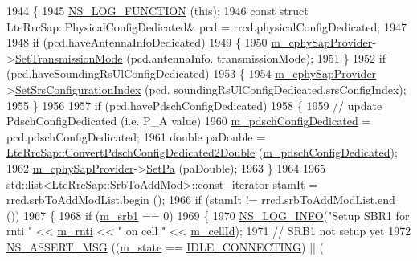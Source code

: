 \begin{DoxyCode}
1944 \{
1945   \hyperlink{log-macros-disabled_8h_a90b90d5bad1f39cb1b64923ea94c0761}{NS\_LOG\_FUNCTION} (\textcolor{keyword}{this});
1946   \textcolor{keyword}{const} \textcolor{keyword}{struct }LteRrcSap::PhysicalConfigDedicated& pcd = rrcd.physicalConfigDedicated;
1947 
1948   \textcolor{keywordflow}{if} (pcd.haveAntennaInfoDedicated)
1949     \{
1950       \hyperlink{classns3_1_1LteUeRrc_a0441858e31f56c75678afa92b7c7193d}{m\_cphySapProvider}->\hyperlink{classns3_1_1LteUeCphySapProvider_a92a30f0799cd2eb146b587e6e07263d0}{SetTransmissionMode} (pcd.antennaInfo.
      transmissionMode);
1951     \}
1952   \textcolor{keywordflow}{if} (pcd.haveSoundingRsUlConfigDedicated)
1953     \{
1954       \hyperlink{classns3_1_1LteUeRrc_a0441858e31f56c75678afa92b7c7193d}{m\_cphySapProvider}->\hyperlink{classns3_1_1LteUeCphySapProvider_ab85e58711660e5a5d05f81e71e357799}{SetSrsConfigurationIndex} (pcd.
      soundingRsUlConfigDedicated.srsConfigIndex);
1955     \}
1956 
1957   \textcolor{keywordflow}{if} (pcd.havePdschConfigDedicated)
1958     \{
1959       \textcolor{comment}{// update PdschConfigDedicated (i.e. P\_A value)}
1960       \hyperlink{classns3_1_1LteUeRrc_a2d13b0f35cab56225d1cb206e2da52f1}{m\_pdschConfigDedicated} = pcd.pdschConfigDedicated;
1961       \textcolor{keywordtype}{double} paDouble = \hyperlink{classns3_1_1LteRrcSap_add6ee85098c06eeb3267175c4628a03a}{LteRrcSap::ConvertPdschConfigDedicated2Double}
       (\hyperlink{classns3_1_1LteUeRrc_a2d13b0f35cab56225d1cb206e2da52f1}{m\_pdschConfigDedicated});
1962       \hyperlink{classns3_1_1LteUeRrc_a0441858e31f56c75678afa92b7c7193d}{m\_cphySapProvider}->\hyperlink{classns3_1_1LteUeCphySapProvider_aba556a033ad6b6a7535b5bfc1f6c0d8a}{SetPa} (paDouble);
1963     \}
1964 
1965   std::list<LteRrcSap::SrbToAddMod>::const\_iterator stamIt = rrcd.srbToAddModList.begin ();
1966   \textcolor{keywordflow}{if} (stamIt != rrcd.srbToAddModList.end ())
1967     \{
1968       \textcolor{keywordflow}{if} (\hyperlink{classns3_1_1LteUeRrc_aeb8ad627a3df9126d146bacb6dc3dce6}{m\_srb1} == 0)
1969         \{
1970           \hyperlink{group__logging_gafbd73ee2cf9f26b319f49086d8e860fb}{NS\_LOG\_INFO}(\textcolor{stringliteral}{"Setup SBR1 for rnti "} << \hyperlink{classns3_1_1LteUeRrc_a8e078d8ef0ad23e670fe2ef08caab84f}{m\_rnti} << \textcolor{stringliteral}{" on cell "} << 
      \hyperlink{classns3_1_1LteUeRrc_aa9d3317734eea9158371d9fccf3a0c48}{m\_cellId});
1971           \textcolor{comment}{// SRB1 not setup yet        }
1972           \hyperlink{assert_8h_aff5ece9066c74e681e74999856f08539}{NS\_ASSERT\_MSG} ((\hyperlink{classns3_1_1LteUeRrc_a81d711739d758a5add38b100086be632}{m\_state} == \hyperlink{classns3_1_1LteUeRrc_a241012c291e75681150c9214e11f6145a05fd8fd51a5d6c77e6927bd575cfd5e4}{IDLE\_CONNECTING}) || (

\end{DoxyCode}
